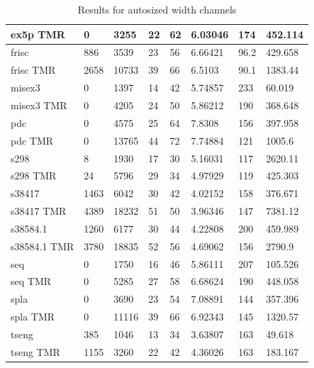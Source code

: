 \documentclass[12pt,final,oneside]{dwThesis} %
\begin{document}
\begin{table}
\begin{adjustwidth}{-1cm}{-1.2cm}
\begin{tabularx}{1.1\textwidth}{llllp{1.5cm}p{2.2cm}p{1.5cm}X}
ex5p TMR & 0 & 3255 & 22 & 62 & 6.03046 & 174 & 452.114\\\midrule
frisc & 886 & 3539 & 23 & 56 & 6.66421 & 96.2 & 429.658\\
frisc TMR & 2658 & 10733 & 39 & 66 & 6.5103 & 90.1 & 1383.44\\\midrule
misex3 & 0 & 1397 & 14 & 42 & 5.74857 & 233 & 60.019\\
misex3 TMR & 0 & 4205 & 24 & 50 & 5.86212 & 190 & 368.648\\\midrule
pdc & 0 & 4575 & 25 & 64 & 7.8308 & 156 & 397.958\\
pdc TMR & 0 & 13765 & 44 & 72 & 7.74884 & 121 & 1005.6\\\midrule
s298 & 8 & 1930 & 17 & 30 & 5.16031 & 117 & 2620.11\\
s298 TMR & 24 & 5796 & 29 & 34 & 4.97929 & 119 & 425.303\\\midrule
s38417 & 1463 & 6042 & 30 & 42 & 4.02152 & 158 & 376.671\\
s38417 TMR & 4389 & 18232 & 51 & 50 & 3.96346 & 147 & 7381.12\\\midrule
s38584.1 & 1260 & 6177 & 30 & 44 & 4.22808 & 200 & 459.989\\
s38584.1 TMR & 3780 & 18835 & 52 & 56 & 4.69062 & 156 & 2790.9\\\midrule
seq & 0 & 1750 & 16 & 46 & 5.86111 & 207 & 105.526\\
seq TMR & 0 & 5285 & 27 & 58 & 6.68624 & 190 & 448.058\\\midrule
spla & 0 & 3690 & 23 & 54 & 7.08891 & 144 & 357.396\\
spla TMR & 0 & 11116 & 39 & 66 & 6.92343 & 145 & 1320.57\\\midrule
tseng & 385 & 1046 & 13 & 34 & 3.63807 & 163 & 49.618\\
tseng TMR & 1155 & 3260 & 22 & 42 & 4.36026 & 163 & 183.167\\\bottomrule
    \end{tabularx}
    \caption{Results for autosized width channels}
    \label{Results-1}
\end{adjustwidth}
\end{table}


\end{document}
